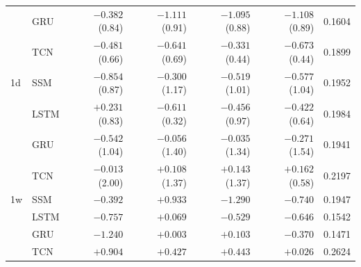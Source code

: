 \begin{table}[t]
\begin{tabular}{llrrrrr}
 & GRU & $-0.382$ (0.84) & $-1.111$ (0.91) & $-1.095$ (0.88) & $-1.108$ (0.89) & 0.1604 \\
 & TCN & $-0.481$ (0.66) & $-0.641$ (0.69) & $-0.331$ (0.44) & $-0.673$ (0.44) & 0.1899 \\
\midrule
1d & SSM & $-0.854$ (0.87) & $-0.300$ (1.17) & $-0.519$ (1.01) & $-0.577$ (1.04) & 0.1952 \\
 & LSTM & $+0.231$ (0.83) & $-0.611$ (0.32) & $-0.456$ (0.97) & $-0.422$ (0.64) & 0.1984 \\
 & GRU & $-0.542$ (1.04) & $-0.056$ (1.40) & $-0.035$ (1.34) & $-0.271$ (1.54) & 0.1941 \\
 & TCN & $-0.013$ (2.00) & $+0.108$ (1.37) & $+0.143$ (1.37) & $+0.162$ (0.58) & 0.2197 \\
\midrule
1w & SSM & $-0.392$ & $+0.933$ & $-1.290$ & $-0.740$ & 0.1947 \\
 & LSTM & $-0.757$ & $+0.069$ & $-0.529$ & $-0.646$ & 0.1542 \\
 & GRU & $-1.240$ & $+0.003$ & $+0.103$ & $-0.370$ & 0.1471 \\
 & TCN & $+0.904$ & $+0.427$ & $+0.443$ & $+0.026$ & 0.2624 \\
\bottomrule
\end{tabular}
\end{table}
